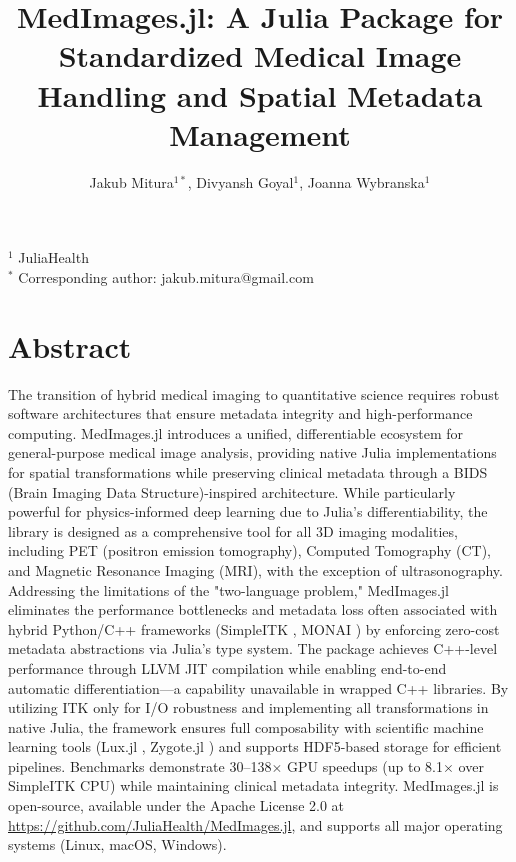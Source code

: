 \documentclass[10pt,letterpaper]{article}
\title{MedImages.jl: A Julia Package for Standardized Medical Image Handling and Spatial Metadata Management}
\author{Jakub Mitura$^{1*}$, Divyansh Goyal$^{1}$, Joanna Wybranska$^{1}$}
\date{}
\begin{document}
\maketitle

\noindent
$^{1}$ JuliaHealth \\
$^{*}$ Corresponding author: jakub.mitura@gmail.com

\section*{Abstract}
The transition of hybrid medical imaging to quantitative science requires robust software architectures that ensure metadata integrity and high-performance computing. MedImages.jl introduces a unified, differentiable ecosystem for general-purpose medical image analysis, providing native Julia implementations for spatial transformations while preserving clinical metadata through a BIDS (Brain Imaging Data Structure)-inspired architecture. While particularly powerful for physics-informed deep learning due to Julia's differentiability, the library is designed as a comprehensive tool for all 3D imaging modalities, including PET (positron emission tomography), Computed Tomography (CT), and Magnetic Resonance Imaging (MRI), with the exception of ultrasonography. Addressing the limitations of the "two-language problem," MedImages.jl eliminates the performance bottlenecks and metadata loss often associated with hybrid Python/C++ frameworks (SimpleITK \cite{LowekampChen2013, YanivLowekamp2017}, MONAI \cite{CardosoLi2022}) by enforcing zero-cost metadata abstractions via Julia's type system. The package achieves C++-level performance through LLVM JIT compilation while enabling end-to-end automatic differentiation—a capability unavailable in wrapped C++ libraries. By utilizing ITK \cite{itk} only for I/O robustness and implementing all transformations in native Julia, the framework ensures full composability with scientific machine learning tools (Lux.jl \cite{pal2023lux}, Zygote.jl \cite{Fischer_2019}) and supports HDF5-based storage for efficient pipelines. Benchmarks demonstrate 30--138$\times$ GPU speedups (up to 8.1$\times$ over SimpleITK CPU) while maintaining clinical metadata integrity. MedImages.jl is open-source, available under the Apache License 2.0 at \url{https://github.com/JuliaHealth/MedImages.jl}, and supports all major operating systems (Linux, macOS, Windows).
\end{document}
